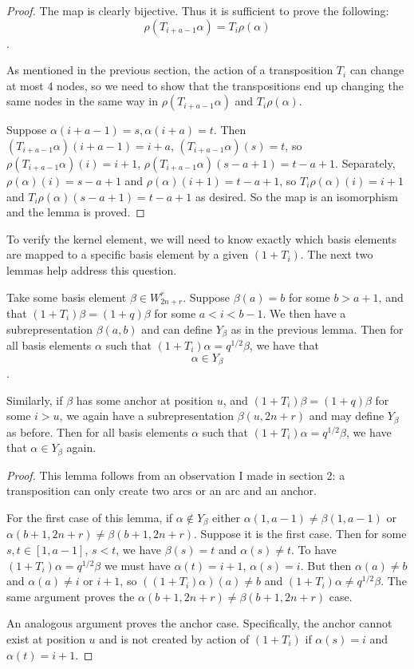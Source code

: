 \documentclass{amsart}
\begin{document}
\vspace{5mm}
\begin{proof}
	
	The map is clearly bijective. Thus it is sufficient to prove the following: $$\rho(T_{i+a-1}\alpha)=T_i\rho(\alpha)$$.
	
	As mentioned in the previous section, the action of a transposition $T_i$ can change at most 4 nodes, so we need to show that the transpositions end up changing the same nodes in the same way in  $\rho(T_{i+a-1}\alpha)$ and $T_i\rho(\alpha)$.
	
	Suppose $\alpha(i+a-1)=s,\alpha(i+a)=t$. Then $(T_{i+a-1}\alpha)(i+a-1)=i+a$, $(T_{i+a-1}\alpha)(s)=t$, so $\rho(T_{i+a-1}\alpha)(i)=i+1$, $\rho(T_{i+a-1}\alpha)(s-a+1)=t-a+1$. Separately, $\rho(\alpha)(i)=s-a+1$ and $\rho(\alpha)(i+1)=t-a+1$, so $T_i\rho(\alpha)(i)=i+1$ and $T_i\rho(\alpha)(s-a+1)=t-a+1$ as desired. So the map is an isomorphism and the lemma is proved.
\end{proof}


\vspace{5mm}
To verify the kernel element, we will need to know exactly which basis elements are mapped to a specific basis element by a given $(1+T_i)$. The next two lemmas help address this question.

\begin{lemma}
	Take some basis element $\beta\in W_{2n+r}^r$. Suppose $\beta(a)=b$ for some $b>a+1$, and that $(1+T_i)\beta=(1+q)\beta$ for some $a<i<b-1$. We then have a subrepresentation $\beta(a,b)$ and can define $Y_\beta$ as in the previous lemma. Then for all basis elements $\alpha$ such that $(1+T_i)\alpha=q^{1/2}\beta$, we have that $$\alpha\in Y_\beta$$.
	
	Similarly, if $\beta$ has some anchor at position $u$, and $(1+T_i)\beta=(1+q)\beta$ for some $i>u$, we again have a subrepresentation $\beta(u,2n+r)$ and may define $Y_\beta$ as before. Then for all basis elements $\alpha$ such that $(1+T_i)\alpha=q^{1/2}\beta$, we have that $\alpha\in Y_\beta$ again.
\end{lemma}

\begin{proof}
	This lemma follows from an observation I made in section 2: a transposition can only create two arcs or an arc and an anchor. 
	
	For the first case of this lemma, if $\alpha\not\in Y_\beta$ either $\alpha(1,a-1)\not=\beta(1,a-1)$ or $\alpha(b+1,2n+r)\not=\beta(b+1,2n+r)$. Suppose it is the first case. Then for some $s,t\in [1,a-1]$, $s<t$, we have $\beta(s)=t$ and $\alpha(s)\not=t$. To have $(1+T_i)\alpha=q^{1/2}\beta$ we must have $\alpha(t)=i+1$, $\alpha(s)=i$. But then $\alpha(a)\not=b$ and $\alpha(a)\not=i$ or $i+1$, so $((1+T_i)\alpha)(a)\not=b$ and $(1+T_i)\alpha\not=q^{1/2}\beta$. The same argument proves the $\alpha(b+1,2n+r)\not=\beta(b+1,2n+r)$ case. 
	
	An analogous argument proves the anchor case. Specifically, the anchor cannot exist at position $u$ and is not created by action of $(1+T_i)$ if $\alpha(s)=i$ and $\alpha(t)=i+1$.
	
\end{proof}
\end{document}
